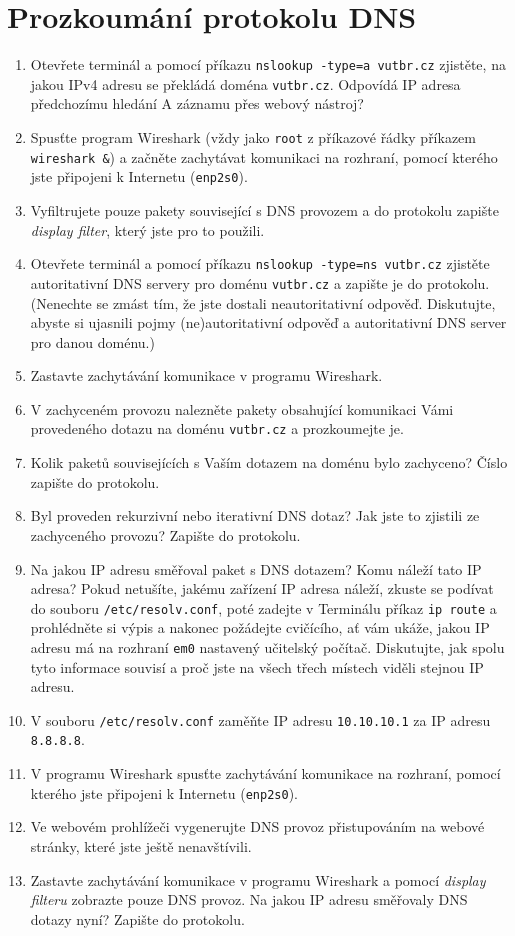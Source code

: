 \section{Prozkoumání protokolu DNS}
\begin{enumerate}
    \item Otevřete terminál a pomocí příkazu \texttt{nslookup -type=a vutbr.cz} zjistěte, na jakou IPv4 adresu se překládá doména \texttt{vutbr.cz}. Odpovídá IP adresa předchozímu hledání A záznamu přes webový nástroj?
    \item Spusťte program Wireshark (vždy jako \texttt{root} z příkazové řádky příkazem \texttt{wireshark \&}) a začněte zachytávat komunikaci na rozhraní, pomocí kterého jste připojeni k Internetu (\texttt{enp2s0}).
	\item Vyfiltrujete pouze pakety související s DNS provozem a do protokolu zapište \emph{display filter}, který jste pro to použili.
    \item Otevřete terminál a pomocí příkazu \texttt{nslookup -type=ns vutbr.cz} zjistěte autoritativní DNS servery pro doménu \texttt{vutbr.cz} a zapište je do protokolu. (Nenechte se zmást tím, že jste dostali neautoritativní odpověď. Diskutujte, abyste si ujasnili pojmy (ne)autoritativní odpověď a autoritativní DNS server pro danou doménu.)
    \item Zastavte zachytávání komunikace v programu Wireshark.
    \item V zachyceném provozu nalezněte pakety obsahující komunikaci Vámi provedeného dotazu na doménu \texttt{vutbr.cz} a prozkoumejte je.
	\item Kolik paketů souvisejících s Vaším dotazem na doménu bylo zachyceno? Číslo zapište do protokolu.
	\item Byl proveden rekurzivní nebo iterativní DNS dotaz? Jak jste to zjistili ze zachyceného provozu? Zapište do protokolu.
	\item Na jakou IP adresu směřoval paket s DNS dotazem? Komu náleží tato IP adresa? Pokud netušíte, jakému zařízení IP adresa náleží, zkuste se podívat do souboru \texttt{/etc/resolv.conf}, poté zadejte v Terminálu příkaz \texttt{ip route} a prohlédněte si výpis a nakonec požádejte cvičícího, ať vám ukáže, jakou IP adresu má na rozhraní \texttt{em0} nastavený učitelský počítač. Diskutujte, jak spolu tyto informace souvisí a proč jste na všech třech místech viděli stejnou IP adresu.
	\item V souboru \texttt{/etc/resolv.conf} zaměňte IP adresu \texttt{10.10.10.1} za IP adresu \texttt{8.8.8.8}.
    \item V programu Wireshark spusťte zachytávání komunikace na rozhraní, pomocí kterého jste připojeni k Internetu (\texttt{enp2s0}).
    \item Ve webovém prohlížeči vygenerujte DNS provoz přistupováním na webové stránky, které jste ještě nenavštívili.
    \item Zastavte zachytávání komunikace v programu Wireshark a pomocí \emph{display filteru} zobrazte pouze DNS provoz. Na jakou IP adresu směřovaly DNS dotazy nyní? Zapište do protokolu.
\end{enumerate}

